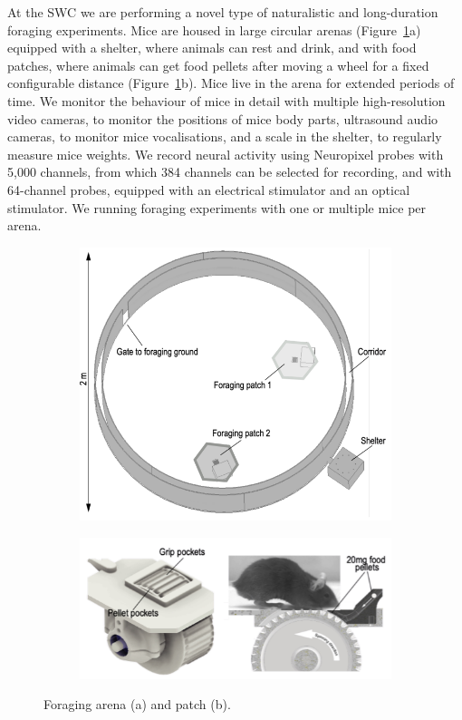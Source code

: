 At the SWC we are performing a novel type of naturalistic and long-duration
foraging experiments. Mice are housed in large circular arenas
(Figure~\ref{fig:arena}a)
equipped with a shelter, where animals can rest and drink, and with food patches,
where animals can get food pellets after moving a wheel for a fixed
configurable distance (Figure~\ref{fig:arena}b). Mice live in the arena for extended periods of time. We
monitor the behaviour of mice in detail with multiple high-resolution video
cameras, to monitor the positions of mice body parts, ultrasound audio cameras,
to monitor mice vocalisations, and a scale in the shelter, to regularly measure
mice weights. We record neural activity using Neuropixel probes with 5,000
channels, from which 384 channels can be selected for recording, and with
64-channel probes, equipped with an electrical stimulator and an optical
stimulator.
%
We running foraging experiments with one or multiple mice per arena.

\begin{figure}
    \centering
    \begin{subfigure}{\textwidth}
        \includegraphics[width=4in]{figures/arena.png}
        \caption{}
    \end{subfigure}
    \begin{subfigure}{\textwidth}
        \includegraphics[width=4in]{figures/patch.png}
        \caption{}
    \end{subfigure}
    \caption{Foraging arena (a) and patch (b).}
    \label{fig:arena}
\end{figure}

